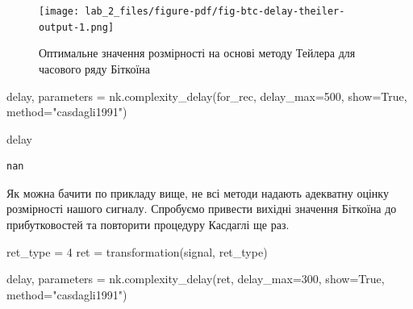\documentclass[
  letterpaper,
]{report}
\newenvironment{Shaded}{\begin{snugshade}}{\end{snugshade}}
\newcommand{\DecValTok}[1]{\textcolor[rgb]{0.68,0.00,0.00}{#1}}
\newcommand{\NormalTok}[1]{\textcolor[rgb]{0.00,0.23,0.31}{#1}}
\newcommand{\OperatorTok}[1]{\textcolor[rgb]{0.37,0.37,0.37}{#1}}
\newcommand{\StringTok}[1]{\textcolor[rgb]{0.13,0.47,0.30}{#1}}
\newcommand{\VariableTok}[1]{\textcolor[rgb]{0.07,0.07,0.07}{#1}}
\begin{document}
\begin{figure}[H]

{\centering \texttt{[image: lab\_2\_files/figure-pdf/fig-btc-delay-theiler-output-1.png]}

}

\caption{\label{fig-btc-delay-theiler}Оптимальне значення розмірності на
основі методу Тейлера для часового ряду Біткоїна}

\end{figure}

\begin{Shaded}
\begin{Highlighting}[]
\NormalTok{delay, parameters }\OperatorTok{=}\NormalTok{ nk.complexity\_delay(for\_rec, }
\NormalTok{                                        delay\_max}\OperatorTok{=}\DecValTok{500}\NormalTok{, show}\OperatorTok{=}\VariableTok{True}\NormalTok{,}
\NormalTok{                                        method}\OperatorTok{=}\StringTok{"casdagli1991"}\NormalTok{)}

\NormalTok{delay}
\end{Highlighting}
\end{Shaded}

\begin{verbatim}
nan
\end{verbatim}

Як можна бачити по прикладу вище, не всі методи надають адекватну оцінку
розмірності нашого сигналу. Спробуємо привести вихідні значення Біткоїна
до прибутковостей та повторити процедуру Касдаглі ще раз.

\begin{Shaded}
\begin{Highlighting}[]
\NormalTok{ret\_type }\OperatorTok{=} \DecValTok{4} 
\NormalTok{ret }\OperatorTok{=}\NormalTok{ transformation(signal, ret\_type)}
\end{Highlighting}
\end{Shaded}

\begin{Shaded}
\begin{Highlighting}[]
\NormalTok{delay, parameters }\OperatorTok{=}\NormalTok{ nk.complexity\_delay(ret, }
\NormalTok{                                        delay\_max}\OperatorTok{=}\DecValTok{300}\NormalTok{, show}\OperatorTok{=}\VariableTok{True}\NormalTok{,}
\NormalTok{                                        method}\OperatorTok{=}\StringTok{"casdagli1991"}\NormalTok{)}
\end{Highlighting}
\end{Shaded}
\end{document}

